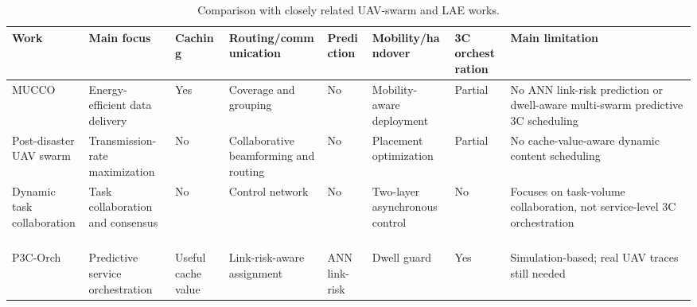 \begin{table}[!t]
\centering
\caption{Comparison with closely related UAV-swarm and LAE works.}
\label{tab:related_work}
\tiny
\begin{tabular}{p{}p{}p{}p{}p{}p{}p{}p{}}
\toprule
Work & Main focus & Caching & Routing/communication & Prediction & Mobility/handover & 3C orchestration & Main limitation \\
\midrule
MUCCO~\cite{wei2025mucco} & Energy-efficient data delivery & Yes & Coverage and grouping & No & Mobility-aware deployment & Partial & No ANN link-risk prediction or dwell-aware multi-swarm predictive 3C scheduling \\
Post-disaster UAV swarm~\cite{zheng2025postdisaster} & Transmission-rate maximization & No & Collaborative beamforming and routing & No & Placement optimization & Partial & No cache-value-aware dynamic content scheduling \\
Dynamic task collaboration~\cite{zhou2026dynamic} & Task collaboration and consensus & No & Control network & No & Two-layer asynchronous control & No & Focuses on task-volume collaboration, not service-level 3C orchestration \\
P3C-Orch & Predictive service orchestration & Useful cache value & Link-risk-aware assignment & ANN link-risk & Dwell guard & Yes & Simulation-based; real UAV traces still needed \\
\bottomrule
\end{tabular}
\end{table}
